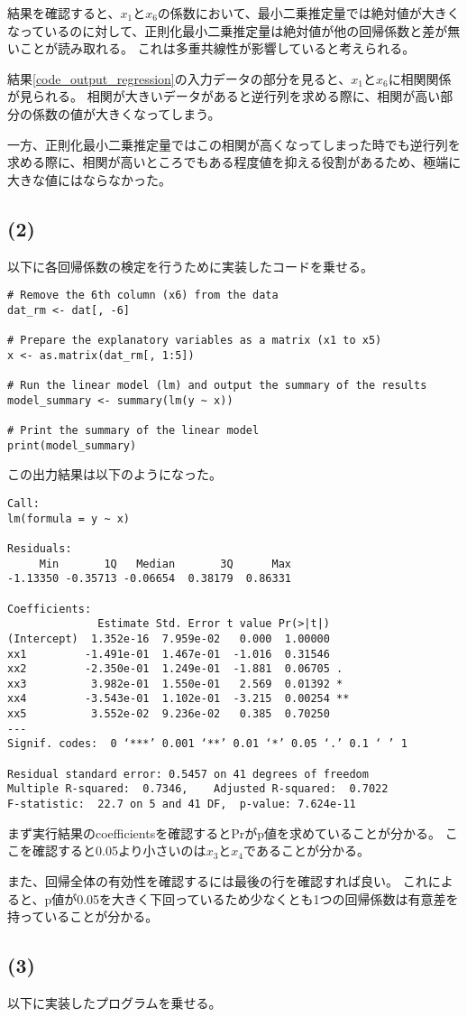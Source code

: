 結果を確認すると、\(x_1\)と\(x_6\)の係数において、最小二乗推定量では絶対値が大きくなっているのに対して、正則化最小二乗推定量は絶対値が他の回帰係数と差が無いことが読み取れる。
これは多重共線性が影響していると考えられる。

結果\ref{code_output_regression}の入力データの部分を見ると、\(x_1\)と\(x_6\)に相関関係が見られる。
相関が大きいデータがあると逆行列を求める際に、相関が高い部分の係数の値が大きくなってしまう。

一方、正則化最小二乗推定量ではこの相関が高くなってしまった時でも逆行列を求める際に、相関が高いところでもある程度値を抑える役割があるため、極端に大きな値にはならなかった。

\subsection{(2)}
以下に各回帰係数の検定を行うために実装したコードを乗せる。

\begin{lstlisting}[caption={回帰係数の検定プログラム}, label={code_check}]
# Remove the 6th column (x6) from the data
dat_rm <- dat[, -6]

# Prepare the explanatory variables as a matrix (x1 to x5)
x <- as.matrix(dat_rm[, 1:5])

# Run the linear model (lm) and output the summary of the results
model_summary <- summary(lm(y ~ x))

# Print the summary of the linear model
print(model_summary)
\end{lstlisting}

この出力結果は以下のようになった。

\begin{lstlisting}[caption={コード\ref{code_check}の実行結果}, label={code_output_check}]
Call:
lm(formula = y ~ x)

Residuals:
     Min       1Q   Median       3Q      Max 
-1.13350 -0.35713 -0.06654  0.38179  0.86331 

Coefficients:
              Estimate Std. Error t value Pr(>|t|)   
(Intercept)  1.352e-16  7.959e-02   0.000  1.00000   
xx1         -1.491e-01  1.467e-01  -1.016  0.31546   
xx2         -2.350e-01  1.249e-01  -1.881  0.06705 . 
xx3          3.982e-01  1.550e-01   2.569  0.01392 * 
xx4         -3.543e-01  1.102e-01  -3.215  0.00254 **
xx5          3.552e-02  9.236e-02   0.385  0.70250   
---
Signif. codes:  0 ‘***’ 0.001 ‘**’ 0.01 ‘*’ 0.05 ‘.’ 0.1 ‘ ’ 1

Residual standard error: 0.5457 on 41 degrees of freedom
Multiple R-squared:  0.7346,    Adjusted R-squared:  0.7022 
F-statistic:  22.7 on 5 and 41 DF,  p-value: 7.624e-11
\end{lstlisting}

まず実行結果のcoefficientsを確認するとPrがp値を求めていることが分かる。
ここを確認すると0.05より小さいのは\(x_3\)と\(x_4\)であることが分かる。

また、回帰全体の有効性を確認するには最後の行を確認すれば良い。
これによると、p値が0.05を大きく下回っているため少なくとも1つの回帰係数は有意差を持っていることが分かる。

\subsection{(3)}
以下に実装したプログラムを乗せる。